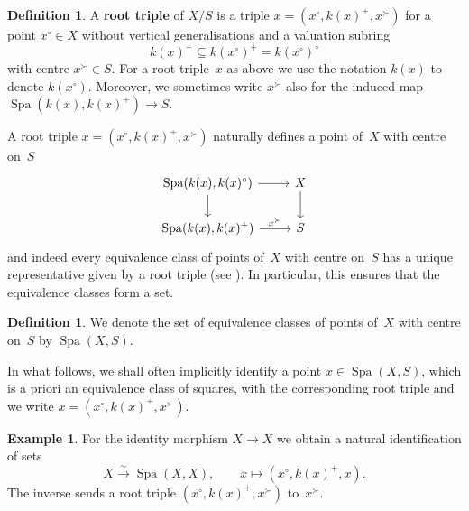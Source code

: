 \documentclass[a4paper,twoside,11pt,reqno]{amsart}
\DeclareMathOperator{\Spa}{Spa}
\theoremstyle{definition}
\newtheorem{defi}[thm]{Definition}
\newtheorem{ex}[thm]{Example}
\numberwithin{equation}{subsection}
\begin{document}
\begin{defi} \label{defi:root-triple}
    A {\bf root triple} of $X/S$ is a triple $x = (x^\circ,k(x)^+,x^\succ)$ for a point $x^\circ \in X$ without vertical generalisations and a valuation subring 
    \[
        k(x)^+ \subseteq k(x^\circ)^+ = k(x^\circ)^\circ
    \]
    with centre $x^\succ \in S$. For a root triple~$x$ as above we use the notation $k(x)$ to denote $k(x^\circ)$.
    Moreover, we sometimes write $x^\succ$ also for the induced map $\Spa(k(x),k(x)^+) \to S$.
\end{defi}

A root triple $x = (x^\circ,k(x)^+,x^\succ)$ naturally defines a point of~$X$ with centre on~$S$
    \[  
        \begin{tikzcd}
            \Spa(k(x), k(x)^\circ) \ar[r] \ar[d] & X \ar[d] \\
            \Spa(k(x), k(x)^+) \ar[r,"x^\succ"] & S
        \end{tikzcd}
    \]
and indeed every equivalence class of points of~$X$ with centre on~$S$ has a unique representative given by a root triple (see \cite[Lemma~4.2]{Solodov-vertical-compactification}).
In particular, this ensures that the equivalence classes form a set.

\begin{defi}
    We denote the set of equivalence classes of points of~$X$ with centre on~$S$ by $\Spa(X,S)$.
\end{defi}

In what follows, we shall often implicitly identify a point $x \in \Spa(X,S)$, which is a priori an equivalence class of squares, with the corresponding root triple and we write $x = (x^\circ,k(x)^+,x^\succ)$.

\begin{ex} \label{ex:comp-affinoid}
    For the identity morphism $X \to X$ we obtain a natural identification of sets
    \[
     X \overset{\sim}{\longrightarrow} \Spa(X,X), \qquad x \mapsto (x^\circ,k(x)^+,x).
    \]
    The inverse sends a root triple $(x^\circ,k(x)^+,x^\succ)$ to~$x^\succ$.
\end{ex}
\end{document}
